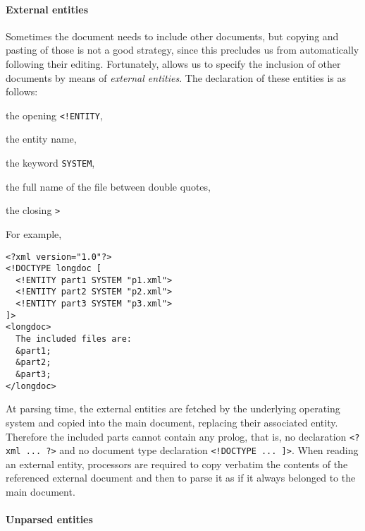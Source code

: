 \paragraph{External entities}

Sometimes the \XML document needs to include other \XML documents, but
copying and pasting of those is not a good strategy, since this
precludes us from automatically following their editing. Fortunately,
\XML allows us to specify the inclusion of other \XML documents by
means of \emph{external entities}. The declaration of these entities
is as follows:
\begin{enumerate*}

  \item the opening \verb|<!ENTITY|,

  \item the entity name,

  \item the keyword \verb|SYSTEM|,

  \item the full name of the \XML file between double quotes,

  \item the closing \verb|>|

\end{enumerate*}
For example,
\begin{verbatim}
<?xml version="1.0"?>
<!DOCTYPE longdoc [
  <!ENTITY part1 SYSTEM "p1.xml">
  <!ENTITY part2 SYSTEM "p2.xml">
  <!ENTITY part3 SYSTEM "p3.xml">
]>
<longdoc>
  The included files are:
  &part1;
  &part2;
  &part3;
</longdoc>
\end{verbatim}
At parsing time, the external entities are fetched by the
underlying operating system and copied into the main \XML document,
replacing their associated entity. Therefore the included parts cannot
contain any prolog, that is, no \XML declaration \verb|<?xml ... ?>|
and no document type declaration \texttt{<!DOCTYPE~...~]>}. When
reading an external entity, \XML processors are required to copy
verbatim the contents of the referenced external document and then to
parse it as if it always belonged to the main document.

\paragraph{Unparsed entities}

